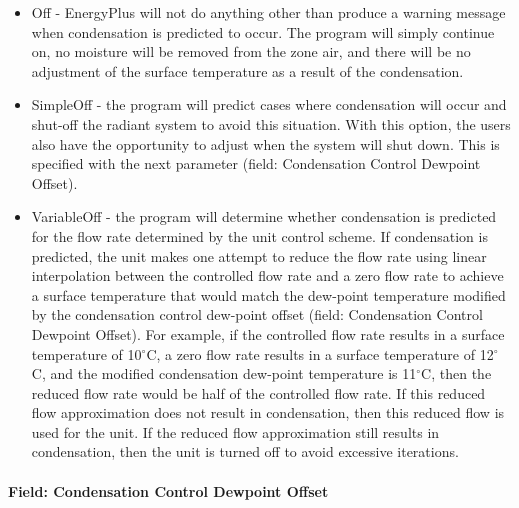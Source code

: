 \begin{itemize}
	\item
	Off - EnergyPlus will not do anything other than produce a warning message when condensation is predicted to occur. The program will simply continue on, no moisture will be removed from the zone air, and there will be no adjustment of the surface temperature as a result of the condensation.
	\item
	SimpleOff - the program will predict cases where condensation will occur and shut-off the radiant system to avoid this situation. With this option, the users also have the opportunity to adjust when the system will shut down. This is specified with the next parameter (field: Condensation Control Dewpoint Offset).
	\item
	VariableOff - the program will determine whether condensation is predicted for the flow rate determined by the unit control scheme.  If condensation is predicted, the unit makes one attempt to reduce the flow rate using linear interpolation between the controlled flow rate and a zero flow rate to achieve a surface temperature that would match the dew-point temperature modified by the condensation control dew-point offset (field: Condensation Control Dewpoint Offset). For example, if the controlled flow rate results in a surface temperature of 10$^\circ$C, a zero flow rate results in a surface temperature of 12$^\circ$C, and the modified condensation dew-point temperature is 11$^\circ$C, then the reduced flow rate would be half of the controlled flow rate.  If this reduced flow approximation does not result in condensation, then this reduced flow is used for the unit.  If the reduced flow approximation still results in condensation, then the unit is turned off to avoid excessive iterations.
\end{itemize}

\paragraph{Field: Condensation Control Dewpoint Offset}\label{field-condensation-control-dewpoint-offset}

